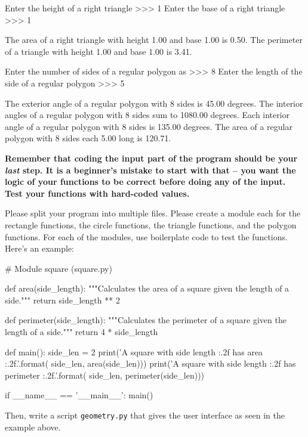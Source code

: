 \documentclass[11pt]{cselabheader}
\begin{document}
{\begin{ex}
\begin{verbatimcode}
Enter the height of a right triangle >>> 1
Enter the base of a right triangle >>> 1

The area of a right triangle with height 1.00 and base 1.00 is 0.50.
The perimeter of a triangle with height 1.00 and base 1.00 is 3.41.

Enter the number of sides of a regular polygon as >>> 8
Enter the length of the side of a regular polygon >>> 5

The exterior angle of a regular polygon with 8 sides is 45.00 degrees.
The interior angles of a regular polygon with 8 sides sum to 1080.00 degrees.
Each interior angle of a regular polygon with 8 sides is 135.00 degrees.
The area of a regular polygon with 8 sides each 5.00 long is 120.71.
  \end{verbatimcode}

  \begin{center}
    \bfseries Remember that coding the input part of the program should be your
    \emph{last} step. It is a beginner's mistake to start with that -- you want
    the logic of your functions to be correct before doing any of the input.
    Test your functions with hard-coded values.
  \end{center}

  Please split your program into multiple files. Please create a module each for
  the rectangle functions, the circle functions, the triangle functions, and the
  polygon functions. For each of the modules, use boilerplate code to test the
  functions. Here's an example:

  \begin{python3code}
# Module square (square.py)

def area(side_length):
    """Calculates the area of a square given the length of a side."""
    return side_length ** 2

def perimeter(side_length):
    """Calculates the perimeter of a square given the length of a side."""
    return 4 * side_length

def main():
    side_len = 2
    print('A square with side length {:.2f} has area {:.2f}.'.format(
        side_len, area(side_len)))
    print('A square with side length {:.2f} has perimeter {:.2f}.'.format(
        side_len, perimeter(side_len)))

if __name__ == '__main__':
    main()
  \end{python3code}

  Then, write a script \texttt{geometry.py} that gives the user interface as
  seen in the example above.


\end{ex}}
\end{document}
